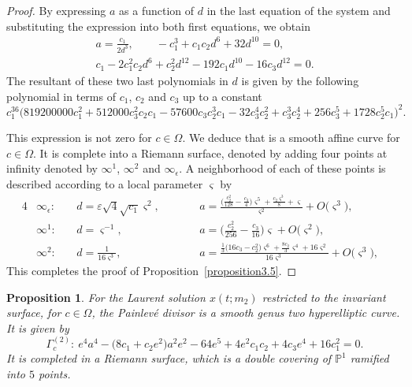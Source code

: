 \documentclass[10pt,a4paper]{amsart}
\numberwithin{equation}{section}
\newtheorem{Proposition}[Theorem]{Proposition}
 { \theoremstyle{definition}
\newtheorem{Definition}[Theorem]{Definition}
\newtheorem{Note}[Theorem]{Note}
\newtheorem{Example}[Theorem]{Example}
\newtheorem{Remark}[Theorem]{Remark} }
\begin{document}
\begin{proof}
By expressing $a$ as a function of $d$ in the last equation of the
system and substituting the expression into both first equations, we
obtain
\begin{gather*}
a=\frac{c_1}{2d^3}, \qquad -c_1^3+c_1c_2d^6+32d^{10}=0, \\
c_1-2c_1^2c_2d^6+c_2^2d^{12}-192c_1d^{10}-16c_3d^{12}=0.
\end{gather*}
 The resultant of these two last polynomials in $d$ is given by the following polynomial in terms of $c_1$,
$c_2$ and $c_3$ up to a constant
\[c_1^{36}\bigl(819200000c_1^2+512000c_3^2c_2c_1-57600c_3c_2^3c_1-32c_3^4c_2^2+c_3^3c_2^4+256c_3^5+1728c_2^5c_1\bigr)^2.
\]

This expression is not zero for $c \in \Omega$. We deduce that
 is a smooth affine curve for $c \in
\Omega$. It is complete into a Riemann surface, denoted
 by adding four points at
infinity denoted by $\infty^{1}$, $\infty^{2}$ and
$\infty_{\epsilon}$. A neighborhood of each of these points is
described according to a local parameter $\varsigma$ by
\begin{alignat}{4}
&\infty_{\epsilon}\colon \ && d =\varepsilon\sqrt{4}\sqrt{c_1}\varsigma^2,\qquad&&
a =\frac{\bigl( \frac { c_2^2}{128}-\frac{c_3}{4} \bigr)\varsigma^5 +\frac{c_2\varsigma^3}{8} +\varsigma}{\varsigma^2} +O\bigl(\varsigma^3\bigr),&\label{valeurde_inftyvarepsilon_D1}\\
&\infty^1\colon \ && d =\varsigma^{-1},\qquad &&
a=\biggl( \frac {c_2^{2}}{256} -\frac{c_3}{16}\biggr)\varsigma+O\bigl(\varsigma^2\bigr),&\label{valeurde_infty1_D1}\\
&\infty^2\colon \ && d =\frac{1}{16\varsigma^3},\qquad&&
a=\frac{\frac{1}{3} \bigl(16c_3-c_2^2\bigr)\varsigma^{6} +\frac{8c_2}{3}\varsigma^{4}+16\varsigma^{2}}{16{\varsigma}^{3}} +O\bigl(\varsigma^3\bigr),&\label{valeurde_infty2_D1}
\end{alignat}
This completes the proof of Proposition~\ref{proposition3.5}.
\end{proof}

\begin{Proposition}
For the Laurent solution $x(t;m_2)$ restricted to the
invariant surface, for $c \in \Omega$, the Painlev\'e divisor
 is a smooth genus two hyperelliptic
curve. It is given by
\begin{equation*}
 \Gamma_c^{(2)}\colon \ e^4a^4-\bigl(8c_1+c_2e^2\bigr)a^2e^2-64e^5+4e^2c_1c_2+4c_3e^4+16c_1^2=0.
\end{equation*}
It is completed in a Riemann surface, which is a double covering of
$\mathbb{P}^1$ ramified into $5$ points.
\end{Proposition}
\end{document}
